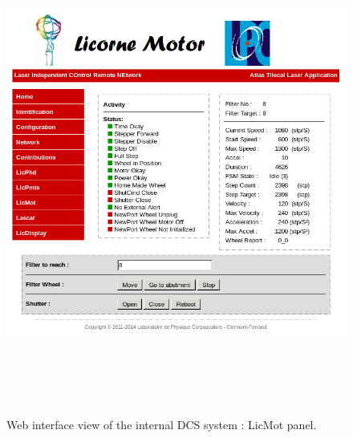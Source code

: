 \begin{appendices}
\begin{figure}[htbp]
\centering
\includegraphics[height=16cm]{figures/licorne_web3.png}
\caption{Web interface view of the internal DCS system : LicMot panel.}\label{fig:licorne_webb}
\end{figure}


\end{appendices}
